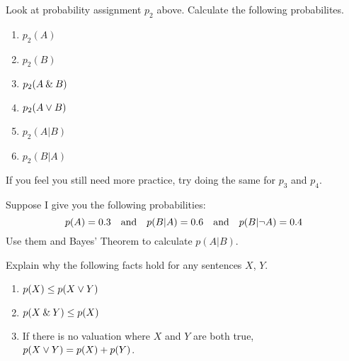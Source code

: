 \problempart Look at probability assignment $p_2$ above. Calculate the following probabilites.
\begin{enumerate}
\item $p_2(A)$
\item $p_2(B)$
\item $p_2(A\mathbin{\&}  B)$
\item $p_2(A \vee B)$
\item $p_2(A | B)$
\item $p_2(B | A)$
\end{enumerate}
If you feel you still need more practice, try doing the same for $p_3$ and $p_4$.

\problempart Suppose I give you the following probabilities:
\[
p(A) = 0.3 \mbox{\ \ \ and\ \ \ } p(B | A) = 0.6 \mbox{\ \ \ and\ \ \ } p(B | \neg A) = 0.4
\]
Use them and Bayes' Theorem to calculate $p(A | B)$.

\problempart Explain why the following facts hold for any sentences $X$, $Y$.
\begin{enumerate}
\item $p(X) \leq p(X \vee Y)$
\item $p(X\mathbin{\&} Y) \leq p(X)$
\item If there is no valuation where $X$ and $Y$ are both true, $p(X \vee Y) = p(X) + p(Y)$.
\end{enumerate}

